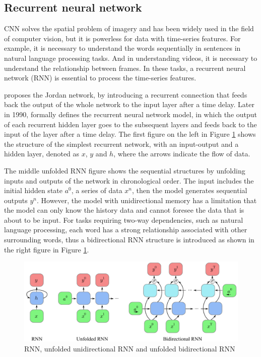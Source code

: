 \subsection{Recurrent neural network} %
CNN solves the spatial problem of imagery and has been widely used in the field of computer vision, but it is powerless for data with time-series features.
For example, it is necessary to understand the words sequentially in sentences in natural language processing tasks.
And in understanding videos, it is necessary to understand the relationship between frames.
In these tasks, a recurrent neural network (RNN) is essential to process the time-series features.

\citet{jordan1986serial} proposes the Jordan network, by introducing a recurrent connection that feeds back the output of the whole network to the input layer after a time delay.
Later in 1990, \citet{elman1990finding} formally defines the recurrent neural network model, in which the output of each recurrent hidden layer goes to the subsequent layers and feeds back to the input of the layer after a time delay.
The first figure on the left in Figure \ref{fig:2-RNN-unfold} shows the structure of the simplest recurrent network, with an input-output and a hidden layer, denoted as $x$, $y$ and $h$, where the arrows indicate the flow of data.

The middle unfolded RNN figure shows the sequential structures by unfolding inputs and outputs of the network in chronological order. 
The input includes the initial hidden state $a^0$, a series of data $x^n$, then the model generates sequential outputs $y^n$. However, the model with unidirectional memory has a limitation that the model can only know the history data and cannot foresee the data that is about to be input.
For tasks requiring two-way dependencies, such as natural language processing, each word has a strong relationship associated with other surrounding words, thus a bidirectional RNN structure is introduced as shown in the right figure in Figure \ref{fig:2-RNN-unfold}.

\begin{figure}[ht!]
    \centering
    \includegraphics[width=\textwidth]{literature/imgs/2-RNN-unfold.pdf}
    \caption{RNN, unfolded unidirectional RNN and unfolded bidirectional RNN}
    \label{fig:2-RNN-unfold}
\end{figure}

